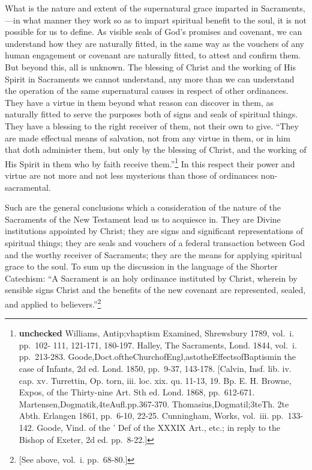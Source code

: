 \documentclass[]{book}
\begin{document}
What is the nature and extent of the supernatural grace imparted in Sacraments,---in what manner they work so as to impart spiritual benefit to the soul, it is not possible for us to define. As visible seals of God's promises and covenant, we can understand how they are naturally fitted, in the same way as the vouchers of any human engagement or covenant are naturally fitted, to attest and confirm them. But beyond this, all is unknown. The blessing of Christ and the working of His Spirit in Sacraments we cannot understand, any more than we can understand the operation of the same supernatural causes in respect of other ordinances. They have a virtue in them beyond what reason can discover in them, as naturally fitted to serve the purposes both of signs and seals of spiritual things. They have a blessing to the right receiver of them, not their own to give. ``They are made effectual means of salvation, not from any virtue in them, or in him that doth administer them, but only by the blessing of Christ, and the working of His Spirit in them who by faith receive them.''\footnote{\textbf{unchecked} Williams, Antip;vhaptism Examined, Shrewsbury 1789, vol.~i. pp.~102- 111, 121-171, 180-197. Halley, The Sacraments, Lond. 1844, vol.~i. pp.~213-283. Goode,Doct.oftheChurchofEngl,astotheEffectsofBaptismin the case of Infants, 2d ed. Lond. 1850, pp.~9-37, 143-178. {[}Calvin, Insf. lib. iv. cap. xv. Turrettin, Op. torn, iii. loc. xix. qu. 11-13, 19. Bp. E. H. Browne, Expos, of the Thirty-nine Art. Sth ed. Lond. 1868, pp.~612-671. Martensen,Dogmatik,4teAufl.pp.367-370. Thomasius,Dogmatil;3teTh. 2te Abth. Erlangen 1861, pp.~6-10, 22-25. Cunningham, Works, vol.~iii. pp.~133-142. Goode, Vind. of the ' Def of the XXXIX Art., etc.; in reply to the Bishop of Exeter, 2d ed. pp.~8-22.{]}} In this respect their power and virtue are not more and not less mysterious than those of ordinances non-sacramental.

Such are the general conclusions which a consideration of the nature of the Sacraments of the New Testament lead us to acquiesce in. They are Divine institutions appointed by Christ; they are signs and significant representations of spiritual things; they are seals and vouchers of a federal transaction between God and the worthy receiver of Sacraments; they are the means for applying spiritual grace to the soul. To sum up the discussion in the language of the Shorter Catechism: ``A Sacrament is an holy ordinance instituted by Christ, wherein by sensible signs Christ and the benefits of the new covenant are represented, sealed, and applied to believers.''\footnote{{[}See above, vol.~i. pp.~68-80.{]}}
\end{document}
